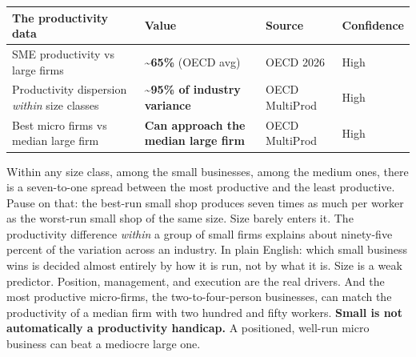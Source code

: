 \documentclass[10pt,twoside,openany]{memoir}
\renewcommand{\arraystretch}{1.1}
\begin{document}
{{{{{{{{{\def\LTcaptype{none} %
{\renewcommand{\arraystretch}{0.9}\begin{longtable}[]{@{}
  >{\raggedright\arraybackslash}p{}
  >{\raggedright\arraybackslash}p{}
  >{\raggedright\arraybackslash}p{}
  >{\raggedright\arraybackslash}p{}@{}}
\toprule\noalign{}
\begin{minipage}[b]{\linewidth}\raggedright
The productivity data
\end{minipage} & \begin{minipage}[b]{\linewidth}\raggedright
Value
\end{minipage} & \begin{minipage}[b]{\linewidth}\raggedright
Source
\end{minipage} & \begin{minipage}[b]{\linewidth}\raggedright
Confidence
\end{minipage} \\
\midrule\noalign{}
\endhead
\bottomrule\noalign{}
\endlastfoot
SME productivity vs large firms & \textbf{\textasciitilde65\%} (OECD
avg) & OECD 2026 & High \\
Productivity dispersion \emph{within} size classes &
\textbf{\textasciitilde95\% of industry variance} & OECD MultiProd &
High \\
Best micro firms vs median large firm & \textbf{Can approach the median
large firm} & OECD MultiProd & High \\
\end{longtable}
}

Within any size class, among the small businesses, among the medium
ones, there is a seven-to-one spread between the most productive and the
least productive. Pause on that: the best-run small shop produces seven
times as much per worker as the worst-run small shop of the same size.
Size barely enters it. The productivity difference \emph{within} a group
of small firms explains about ninety-five percent of the variation
across an industry. In plain English: which small business wins is
decided almost entirely by how it is run, not by what it is. Size is a
weak predictor. Position, management, and execution are the real
drivers. And the most productive micro-firms, the two-to-four-person
businesses, can match the productivity of a median firm with two hundred
and fifty workers. \textbf{Small is not automatically a productivity
handicap.} A positioned, well-run micro business can beat a mediocre
large one.

}}}}}}}}}
\end{document}
